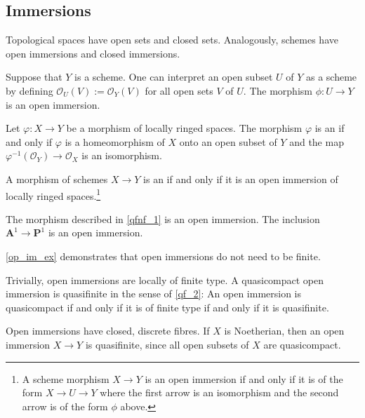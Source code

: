 \documentclass [11 pt, oneside] {article}
\begin{document}
\subsection{Immersions}
Topological spaces have open sets and closed sets. Analogously, schemes have open immersions and closed immersions. 

Suppose that $Y$ is a scheme. One can interpret an open subset $U$ of $Y$ as a scheme by defining $\mathscr{O}_U (V):=\mathscr{O}_Y(V)$ for all open sets $V$ of $U$. The morphism $\phi : U\longrightarrow Y$ is an open immersion.

\begin{definition}[ ]\label{}\text{}
Let $\varphi:X\longrightarrow Y$ be a morphism of locally ringed spaces. The morphism $\varphi$ is an  if and only if $\varphi$ is a homeomorphism of $X$ onto an open subset of $Y$ and the map $\varphi^{-1}(\mathscr{O}_Y)\longrightarrow \mathscr{O}_X$ is an isomorphism.
\end{definition}

A morphism of schemes $X\longrightarrow Y$ is an  if and only if it is an open immersion of locally ringed spaces.\footnote{A scheme morphism $X\longrightarrow Y$ is an open immersion if and only if it is of the form $X\longrightarrow U\longrightarrow Y$ where the first arrow is an isomorphism and the second arrow is of the form $\phi$ above.}

\begin{example}[ ]\label{op_im_ex}\text{}
The morphism described in \cref{qfnf_1} is an open immersion. The inclusion $\mathbf{A}^1 \longrightarrow \mathbf{P}^1$ is an open immersion.
\end{example}

\begin{remark}
	\cref{op_im_ex} demonstrates that open immersions do not need to be finite. 
\end{remark}

\begin{remark}
	Trivially, open immersions are locally of finite type. A quasicompact open immersion is quasifinite in the sense of \cref{qf_2}: An open immersion is quasicompact if and only if it is of finite type if and only if it is quasifinite.
\end{remark}

\begin{remark}
	Open immersions have closed, discrete fibres. If $X$ is Noetherian, then an open immersion $X\longrightarrow Y$ is quasifinite, since all open subsets of $X$ are quasicompact.
\end{remark}
\end{document}
